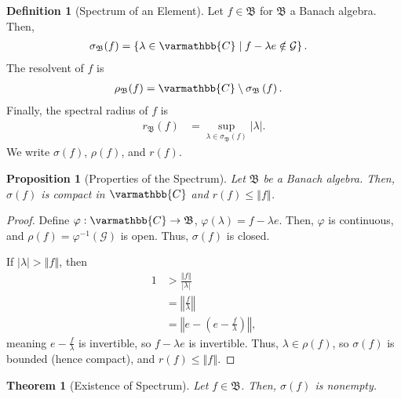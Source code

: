 \documentclass[10pt]{extarticle}
\newcommand{\C}{\mathbb{C}}
\newcommand{\norm}[1]{\left\Vert #1\right\Vert}
\newcommand{\set}[1]{\left\{#1\right\}}
\theoremstyle{plain}
\newtheorem*{theorem}{Theorem}
\newtheorem*{proposition}{Proposition}
\theoremstyle{definition}
\newtheorem*{definition}{Definition}
\theoremstyle{note}
\renewcommand*{\mathbb}[1]{\varmathbb{#1}}
\renewcommand{\newline}{\hfill\break}
\begin{document}
\begin{definition}[Spectrum of an Element]
  Let $f\in \mathfrak{B}$ for $\mathfrak{B}$ a Banach algebra. Then,
  \begin{align*}
    \sigma_{\mathfrak{B}}(f) &= \set{\lambda \in \C\mid f - \lambda e\notin \mathcal{G}}.
  \end{align*}
  The resolvent of $f$ is
  \begin{align*}
    \rho_{\mathfrak{B}}(f) &= \C \setminus \sigma_{\mathfrak{B}}\left(f\right).
  \end{align*}
  Finally, the spectral radius of $f$ is
  \begin{align*}
    r_{\mathfrak{B}}\left(f\right) &= \sup_{\lambda \in \sigma_{\mathfrak{B}}(f)}|\lambda|.
  \end{align*}
  We write $\sigma(f)$, $\rho(f)$, and $r(f)$.
\end{definition}
\begin{proposition}[Properties of the Spectrum]
  Let $\mathfrak{B}$ be a Banach algebra. Then, $\sigma(f)$ is compact in $\C$ and $r(f) \leq \norm{f}$.
\end{proposition}
\begin{proof}
  Define $\varphi: \C\rightarrow \mathfrak{B}$, $\varphi(\lambda) = f - \lambda e$. Then, $\varphi$ is continuous, and $\rho(f) = \varphi^{-1}\left(\mathcal{G}\right)$ is open. Thus, $\sigma(f)$ is closed.\newline

  If $|\lambda| > \norm{f}$, then
  \begin{align*}
    1 &> \frac{\norm{f}}{|\lambda|}\\
      &= \norm{\frac{f}{\lambda}}\\
      &= \norm{e - \left(e - \frac{f}{\lambda}\right)},
  \end{align*}
  meaning $e - \frac{f}{\lambda}$ is invertible, so $f - \lambda e$ is invertible. Thus, $\lambda \in \rho(f)$, so $\sigma(f)$ is bounded (hence compact), and $r(f) \leq \norm{f}$.
\end{proof}
\begin{theorem}[Existence of Spectrum]
  Let $f\in \mathfrak{B}$. Then, $\sigma(f)$ is nonempty.
\end{theorem}
\end{document}
